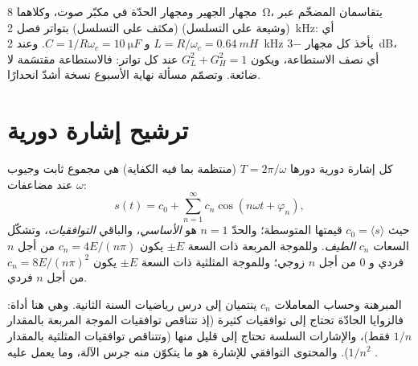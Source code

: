 \begin{example}\label{ex:b1:filters-transfer-functions:crossover}
مجهار الجهير ومجهار الحدّة في مكبّر صوت، وكلاهما \qty{8}{\ohm}، يتقاسمان
المضخّم عبر  (وشيعة على التسلسل)  (مكثف على
التسلسل) بتواتر فصل \qty{2}{kHz}: أي $L = R/\omega_c = \qty{0.64}{mH}$ و
$C = 1/R\omega_c = \qty{10}{\micro F}$. وعند \qty{2}{kHz} يأخذ كل مجهار
\qty{-3}{dB}، أي نصف الاستطاعة، ويكون $G_L^2 + G_H^2 = 1$ عند كل
تواتر: فالاستطاعة مقتسَمة لا ضائعة. وتصمّم مسألة نهاية الأسبوع
نسخة أشدّ انحدارًا.
\end{example}

\section{ترشيح إشارة دورية}

\begin{theorem}\label{thm:b1:filters-transfer-functions:fourier}
كل إشارة دورية دورها $T = 2\pi/\omega$ (منتظمة بما فيه الكفاية) هي
مجموع ثابت وجيوب عند مضاعفات $\omega$:
\[
s(t) = c_0 + \sum_{n = 1}^{\infty} c_n\cos(n\omega t + \varphi_n),
\]
حيث $c_0 = \langle s\rangle$ قيمتها المتوسطة؛ والحدّ $n = 1$ هو
\emph{الأساسي}، والباقي \emph{التوافقيات}، وتشكّل
السعات $c_n$ \emph{الطيف}. وللموجة المربعة ذات السعة
$\pm E$ يكون $c_n = 4E/(n\pi)$ من أجل $n$ فردي و $0$ من أجل $n$ زوجي؛ وللموجة
المثلثية ذات السعة $\pm E$ يكون $c_n = 8E/(n\pi)^2$ من أجل $n$ فردي.
\end{theorem}
\admitted

\begin{remark}\label{rem:b1:filters-transfer-functions:fourier}
المبرهنة وحساب المعاملات $c_n$ ينتميان إلى درس رياضيات السنة
الثانية. وهي هنا أداة: فالزوايا الحادّة تحتاج إلى توافقيات كثيرة
(إذ تتناقص توافقيات الموجة المربعة بالمقدار $1/n$ فقط)، والإشارات السلسة
تحتاج إلى قليل منها (وتتناقص توافقيات المثلثية بالمقدار $1/n^2$). والمحتوى التوافقي للإشارة
هو ما يتكوّن منه جرس الآلة، وما يعمل عليه .
\end{remark}

